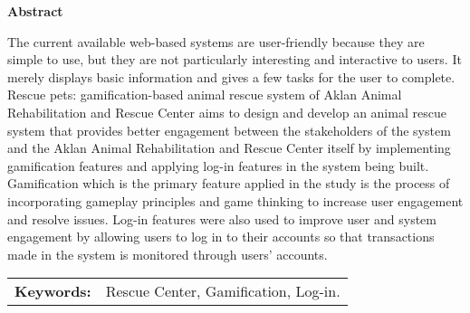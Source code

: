\begin{center}
\textbf{Abstract}
\end{center}
\setlength{\parindent}{0pt}
The current available web-based systems are user-friendly because they are simple to use, but they are not particularly interesting and interactive to users. It merely displays basic information and gives a few tasks for the user to complete. Rescue pets: gamification-based animal rescue system of Aklan Animal Rehabilitation and Rescue Center aims to design and develop an animal rescue system that provides better engagement between the stakeholders of the system and the Aklan Animal Rehabilitation and Rescue Center itself by implementing gamification features and applying log-in features in the system being built. Gamification which is the primary feature applied in the study is the process of incorporating gameplay principles and game thinking to increase user engagement and resolve issues. Log-in features were also used to improve user and system engagement by allowing users to log in to their accounts so that transactions made in the system is monitored through users' accounts.






\begin{tabular}{lp{4.75in}}
\hspace{-0.10em}\textbf{Keywords:}\hspace{0.5em} & Rescue Center, Gamification, Log-in.\\
\end{tabular}

